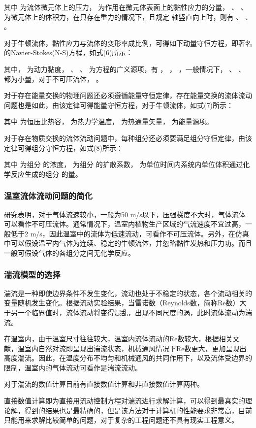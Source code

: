 其中 为流体微元体上的压力， 为作用在微元体表面上的黏性应力的分量， 、 、 为微元体上的体积力，在只存在重力的情况下，且规定 轴竖直向上时，则有 、 、 。

对于牛顿流体，黏性应力与流体的变形率成比例，可得如下动量守恒方程，即著名的Navier-Stokes(N-S)方程，如式(6)所示：

其中， 为动力黏度， 、 、 为方程的广义源项，有 ， ， ，一般情况下， 、 、 都为小量，对于不可压流体， 。

对于存在能量交换的物理问题还必须遵循能量守恒定律，存在能量交换的流体流动问题也是如此，由该定律可得能量守恒方程，对于牛顿流体，如式(7)所示：

其中 为恒压比热容， 为热力学温度， 为热通量矢量， 为能量源项。

对于存在物质交换的流体流动问题中，每种组分还必须要满足组分守恒定律，由该定律可得组分守恒方程，如式(8)所示：

其中 为组分 的浓度， 为组分 的扩散系数， 为单位时间内系统内单位体积通过化学反应生成的组分 的量。
		\subsubsection{温室流体流动问题的简化}
研究表明，对于气体流速较小，一般为50 m/s以下，压强梯度不大时，气体流体可以看作不可压流体。通常情况下，温室内植物生产区域的气流速度不宜过高，一般低于2 m/s，因此温室中的流体为低速流动，可看作不可压流体。另外，在仿真中可以假设温室内气体为连续、稳定的牛顿流体，并忽略黏性发热和压力功。而且一般可假设气体的各组分之间无化学反应。
		\subsubsection{湍流模型的选择}
湍流是一种即使边界条件不发生变化，流动也处于不稳定的状态，各个流动相关的变量随机发生变化。根据流动实验结果，当雷诺数（Reynolds数，简称Re数）大于另一个临界值时，流体流动将变得混乱，出现不同尺度的涡，此时流体流动为湍流。

在温室内，由于温室尺寸往往较大，温室内流体流动的Re数较大，根据相关文献，温室内自然对流即呈现出湍流状态，机械通风情况下Re数更大，更加呈现出高度湍流。因此，在温度分布不均匀和机械通风的共同作用下，以及流体受边界的限制，温室内的气体流动可看作是湍流流动。

对于湍流的数值计算目前有直接数值计算和非直接数值计算两种。

直接数值计算即为直接用流动控制方程对湍流进行求解计算，可以得到最真实的理论解，得到的结果也是最精确的，但是该方法对于计算机的性能要求非常高，目前只能用来求解比较简单的问题，对于复杂的工程问题还不具有现实工程意义。

